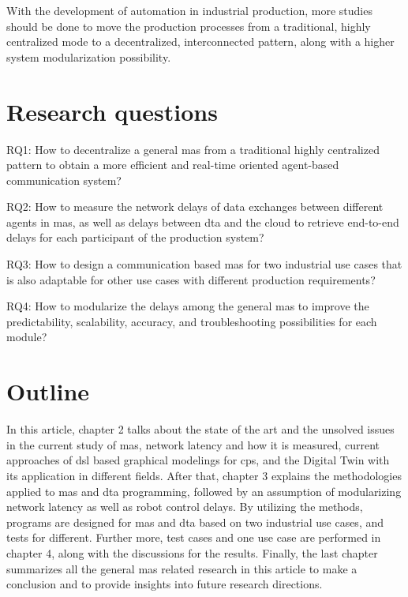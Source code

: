With the development of automation in industrial production, more studies 
should be done to move the production processes from a traditional, highly 
centralized mode to a decentralized, interconnected pattern, along with 
a higher system modularization possibility. 









\section{Research questions}
RQ1: How to decentralize a general \gls{mas} from a traditional highly 
centralized pattern to obtain a more efficient and real-time oriented agent-based 
communication system?

RQ2: How to measure the network delays of data exchanges between 
different agents in \gls{mas}, as well as delays between \gls{dta} and the cloud 
to retrieve end-to-end delays for each participant of the production system?

RQ3: How to design a communication based \gls{mas} for two industrial use 
cases that is also adaptable for other use cases with different production 
requirements? 

RQ4: How to modularize the delays among the general \gls{mas} to improve the 
predictability, scalability, accuracy, and troubleshooting possibilities for 
each module?  



\section{Outline}
In this article, chapter 2 talks about the state of the art and 
the unsolved issues in the current study of \gls{mas}, network 
latency and how it is measured, current approaches of \gls{dsl} 
based graphical modelings for \gls{cps}, and the Digital Twin with 
its application in different fields. After that, chapter 3 explains 
the methodologies applied to \gls{mas} and \gls{dta} programming, 
followed by an assumption of modularizing network latency as well 
as robot control delays. By utilizing the methods, programs are 
designed for \gls{mas} and \gls{dta} based on two industrial use cases, 
and tests for different. Further more, test cases and one use case are 
performed in chapter 4, along with 
the discussions for the results. Finally, the last chapter summarizes 
all the general \gls{mas} related research in this article to make a 
conclusion and to provide insights into future research directions.  